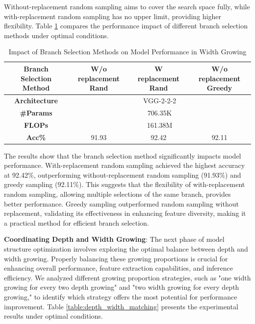 \documentclass[preprint,12pt]{elsarticle}
\begin{document}
Without-replacement random sampling aims to cover the search space fully, while with-replacement random sampling has no upper limit, providing higher flexibility. Table \ref{table:width_growth_branches} compares the performance impact of different branch selection methods under optimal conditions.

\begin{table}[ht]
\centering
\tiny
\renewcommand{\arraystretch}{1.3}
\begin{adjustbox}{center}
\begin{tabular}{c|ccc}
\hline
\textbf{Branch Selection Method} & \textbf{W/o replacement Rand} & \textbf{W replacement Rand} & \textbf{W/o replacement Greedy} \\
\hline
\textbf{Architecture} & \multicolumn{3}{c}{VGG-2-2-2} \\
\hline
\textbf{\#Params} & \multicolumn{3}{c}{706.35K} \\
\hline
\textbf{FLOPs} & \multicolumn{3}{c}{161.38M} \\
\hline
\textbf{Acc\%} & 91.93 & 92.42 & 92.11 \\
\hline
\end{tabular}
\end{adjustbox}
\caption{Impact of Branch Selection Methods on Model Performance in Width Growing}
\label{table:width_growth_branches}
\end{table}

The results show that the branch selection method significantly impacts model performance. With-replacement random sampling achieved the highest accuracy at 92.42\%, outperforming without-replacement random sampling (91.93\%) and greedy sampling (92.11\%). This suggests that the flexibility of with-replacement random sampling, allowing multiple selections of the same branch, provides better performance. Greedy sampling outperformed random sampling without replacement, validating its effectiveness in enhancing feature diversity, making it a practical method for efficient branch selection.

\textbf{Coordinating Depth and Width Growing}: The next phase of model structure optimization involves exploring the optimal balance between depth and width growing. Properly balancing these growing proportions is crucial for enhancing overall performance, feature extraction capabilities, and inference efficiency. We analyzed different growing proportion strategies, such as "one width growing for every two depth growing" and "two width growing for every depth growing," to identify which strategy offers the most potential for performance improvement. Table \ref{table:depth_width_matching} presents the experimental results under optimal conditions.
\end{document}
